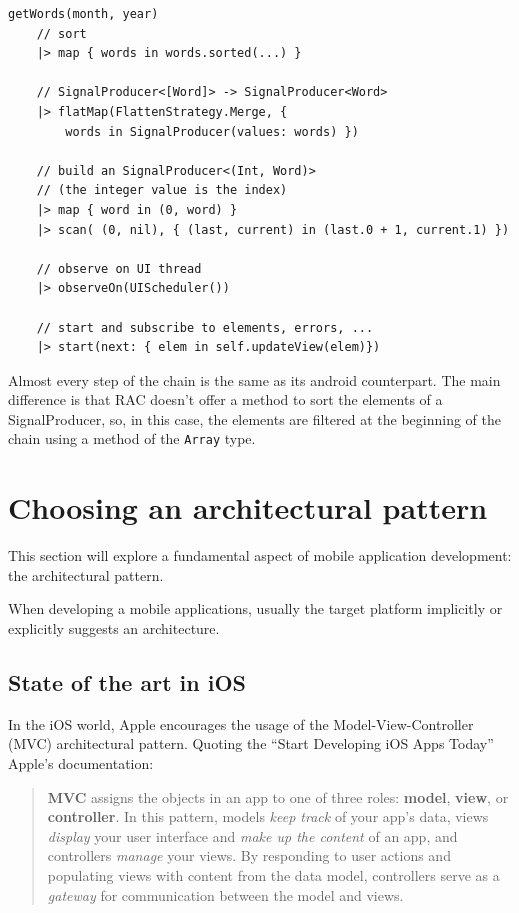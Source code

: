 \begin{verbatim}
getWords(month, year)
    // sort
    |> map { words in words.sorted(...) }

    // SignalProducer<[Word]> -> SignalProducer<Word>
    |> flatMap(FlattenStrategy.Merge, { 
    	words in SignalProducer(values: words) })

    // build an SignalProducer<(Int, Word)>
    // (the integer value is the index)
    |> map { word in (0, word) }
    |> scan( (0, nil), { (last, current) in (last.0 + 1, current.1) })

    // observe on UI thread
    |> observeOn(UIScheduler())

    // start and subscribe to elements, errors, ...
    |> start(next: { elem in self.updateView(elem)})
\end{verbatim}

Almost every step of the chain is the same as its android counterpart.
The main difference is that RAC doesn't offer a method to sort the
elements of a SignalProducer, so, in this case, the elements are
filtered at the beginning of the chain using a method of the
\texttt{Array} type.


\section{Choosing an architectural
pattern}\label{choosing-an-architectural-pattern}

This section will explore a fundamental aspect of mobile application
development: the architectural pattern.

When developing a mobile applications, usually the target platform
implicitly or explicitly suggests an architecture.

\subsection{State of the art in iOS}\label{state-of-the-art-in-ios}

In the iOS world, Apple encourages the usage of the
Model-View-Controller (MVC) architectural pattern. Quoting the ``Start
Developing iOS Apps Today'' Apple's documentation:

\begin{quote}
\textbf{MVC} assigns the objects in an app to one of three roles:
\textbf{model}, \textbf{view}, or \textbf{controller}. In this pattern,
models \emph{keep track} of your app's data, views \emph{display} your
user interface and \emph{make up the content} of an app, and controllers
\emph{manage} your views. By responding to user actions and populating
views with content from the data model, controllers serve as a
\emph{gateway} for communication between the model and views.
\end{quote}

